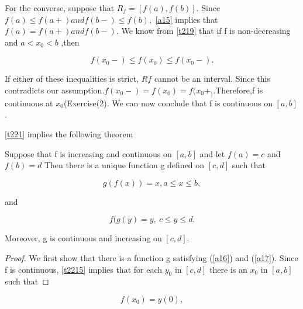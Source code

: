 \begin{multicols}{2}
For the converse, suppose that $R_f = [f(a),f(b)].$ Since $f(a) \leq f(a+) and f(b-) \leq f(b),$ \ref{a15} implies that $f(a) = f(a+) and f(b-).$ We know from \ref{t219} that if f is non-decreasing and $a < x_0 < b$ ,then


$$f(x_0 -) \leq f(x_0) \leq f(x_0 -).$$


If either of these inequalities is strict, $Rf$ cannot be an interval. Since this contradicts our
assumption.$f(x_0 -) = f(x_0) = f(x_0 +_)$.Therefore,f is continuous at $x_0$(Exercise(2).
We can now conclude that f is continuous on $[a,b]$.




\ref{t221} implies the following theorem



\begin{theorem}\label{t2215}
 Suppose that f is increasing and continuous on $[a, b]$ and let $f(a)= c$ and $f (b) = d $ Then there is a unique function g defined on $[c,d]$ such that
\end{theorem}






\begin{equation}\label{a16}
g(f(x)) = x, a \leq x \leq b,
\end{equation}

and 

\begin{equation}\label{a17}
f(g(y) = y,\ c \leq y \leq d.
\end{equation}


Moreover, g is continuous and increasing on $[c,d]$.



\begin{proof}
We first show that there is a function g satisfying (\ref{a16}) and (\ref{a17}). Since f is continuous, \ref{t2215} implies that for each $y_0$ in $[c,d]$ there is an $x_0$ in $[a, b]$ such that
\end{proof}



\begin{equation}\label{a18}
f(x_0) = y(0),
\end{equation}  

\end{multicols}
